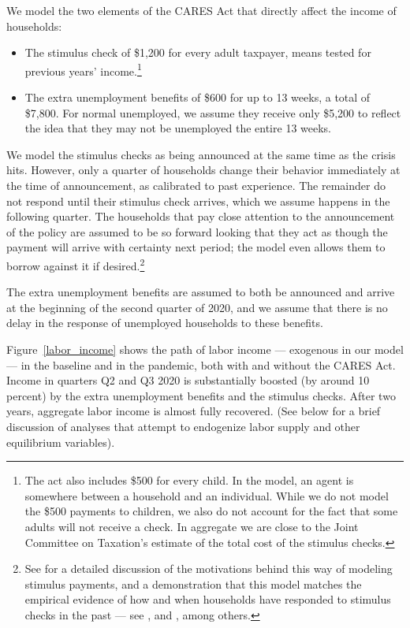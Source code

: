 \documentclass[titlepage,a4paper]{\econtex}
\begin{document}
We model the two elements of the CARES Act that directly affect the income of households:
\begin{itemize}
\item The stimulus check of \$1,200 for every adult taxpayer, means tested for previous years' income.\footnote{The act also includes \$500 for every child. In the model, an agent is somewhere between a household and an individual. While we do not model the \$500 payments to children, we also do not account for the fact that some adults will not receive a check. In aggregate we are close to the Joint Committee on Taxation's estimate of the total cost of the stimulus checks.}
\item The extra unemployment benefits of \$600 for up to 13 weeks, a total of \$7,800.
  For normal unemployed, we assume they receive only \$5,200 to reflect the idea that they may not be unemployed the entire 13 weeks.
\end{itemize}

We model the stimulus checks as being announced at the same time as the crisis hits.
However, only a quarter of households change their behavior immediately at the time of announcement, as calibrated to past experience.
The remainder do not respond until their stimulus check arrives, which we assume happens in the following quarter.
The households that pay close attention to the announcement of the policy are assumed to be so forward looking that they act as though the payment will arrive with certainty next period; the model even allows them to borrow against it if desired.\footnote{See \cite{carroll_sticky_2020} for a detailed discussion of the motivations behind this way of modeling stimulus payments, and a demonstration that this model matches the empirical evidence of how and when households have responded to stimulus checks in the past --- see \cite{psjmMPC2008}, \cite{brodaParker} and \cite{parker25million}, among others.}

The extra unemployment benefits are assumed to both be announced and arrive at the beginning of the second quarter of 2020, and we assume that there is no delay in the response of unemployed households to these benefits.

Figure~\ref{labor_income} shows the path of labor income --- exogenous in our model --- in the baseline and in the pandemic, both with and without the CARES Act.
Income in quarters Q2 and Q3 2020 is substantially boosted (by around 10 percent) by the extra unemployment benefits and the stimulus checks.
After two years, aggregate labor income is almost fully recovered.  (See below for a brief discussion of analyses that attempt to endogenize labor supply and other equilibrium variables).
\end{document}
